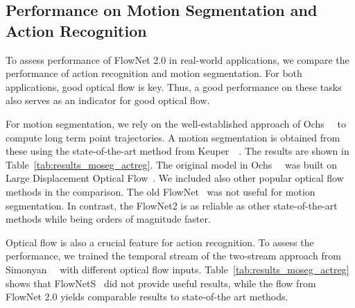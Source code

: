 \documentclass[10pt,twocolumn,letterpaper]{article}%
\begin{document}
\subsection{Performance on Motion Segmentation and Action Recognition} 

To assess performance of FlowNet 2.0 in real-world applications, we compare the performance of action recognition and motion segmentation. For both applications, good optical flow is key. Thus, a good performance on these tasks also serves as an indicator for good optical flow. 

For motion segmentation, we rely on the well-established approach of Ochs~\etal~\cite{Ochs14} to compute long term point trajectories. A motion segmentation is obtained from these using the state-of-the-art method from Keuper~\etal~\cite{KB15b}. The results are shown in Table~\ref{tab:results_moseg_actreg}. The original model in Ochs~\etal~\cite{KB15b} was built on Large Displacement Optical Flow~\cite{ldof}. We included also other popular optical flow methods in the comparison. The old FlowNet~\cite{DFIB15} was not useful for motion segmentation. In contrast, the FlowNet2 is as reliable as other state-of-the-art methods while being orders of magnitude faster. 



Optical flow is also a crucial feature for action recognition. To assess the performance, we trained the temporal stream of the two-stream approach from Simonyan~\etal~\cite{twostream} with different optical flow inputs. Table~\ref{tab:results_moseg_actreg} shows that FlowNetS~\cite{DFIB15} did not provide useful results, while the flow from FlowNet 2.0 yields comparable results to state-of-the art methods. 
\end{document}

